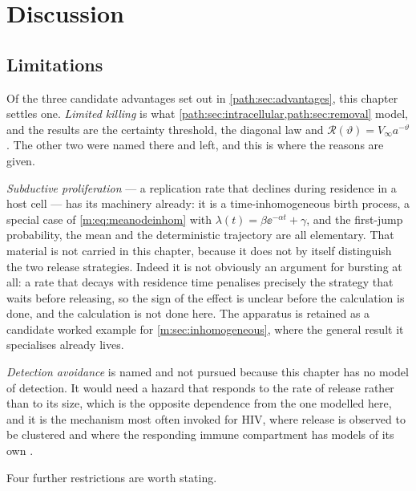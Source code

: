 
\section{Discussion}
\label{path:sec:discussion}

\subsection{Limitations}
\label{path:sec:limitations}

Of the three candidate advantages set out in \cref{path:sec:advantages},
this chapter settles one. \emph{Limited killing} is what
\cref{path:sec:intracellular,path:sec:removal} model, and the results are
the certainty threshold, the diagonal law and
$\mathcal{R}(\vartheta)=V_\infty a^{-\vartheta}$. The other two were named
there and left, and this is where the reasons are given.

\emph{Subductive proliferation} --- a replication rate that declines during
residence in a host cell --- has its machinery already: it is a
time-inhomogeneous birth process, a special case of \cref{m:eq:meanodeinhom}
with $\lambda(t)=\beta\ee^{-\alpha t}+\gamma$, and the first-jump
probability, the mean and the deterministic trajectory are all elementary.
That material is not carried in this chapter, because it does not by itself
distinguish the two release strategies. Indeed it is not obviously an
argument for bursting at all: a rate that decays with residence time
penalises precisely the strategy that waits before releasing, so the sign of
the effect is unclear before the calculation is done, and the calculation is
not done here. The apparatus is retained as a candidate worked example for
\cref{m:sec:inhomogeneous}, where the general result it specialises already
lives.

\emph{Detection avoidance} is named and not pursued because this chapter
has no model of detection. It would need a hazard that responds to the rate
of release rather than to its size, which is the opposite dependence from
the one modelled here, and it is the mechanism most often invoked for HIV,
where release is observed to be clustered and where the responding immune
compartment has models of its own \cite{conway2018modeling}.

Four further restrictions are worth stating.

